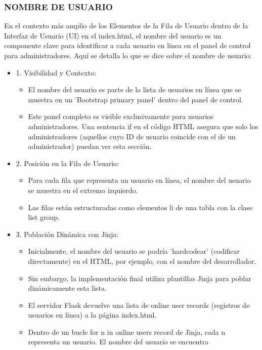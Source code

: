 \documentclass{report}
\begin{document}
\subsubsection{NOMBRE DE USUARIO}
En el contexto más amplio de los Elementos de la Fila de Usuario dentro de la Interfaz de Usuario (UI) en el index.html, el nombre del 
usuario es un componente clave para identificar a cada usuario en línea en el panel de control para administradores.
Aquí se detalla lo que se dice sobre el nombre de usuario:
\begin{itemize}
    \item 1. Visibilidad y Contexto:
        \begin{itemize}
            \item El nombre del usuario es parte de la lista de usuarios en línea que se muestra en un 'Bootstrap primary panel' dentro 
            del panel de control.
            \item Este panel completo es visible exclusivamente para usuarios administradores. Una sentencia if en el código HTML asegura 
            que solo los administradores (aquellos cuyo ID de usuario coincide con el de un administrador) puedan ver esta sección.
        \end{itemize}
    \item 2. Posición en la Fila de Usuario:
        \begin{itemize}
            \item Para cada fila que representa un usuario en línea, el nombre del usuario se muestra en el extremo izquierdo.
            \item Las filas están estructuradas como elementos li de una tabla con la clase list group.        
        \end{itemize}
    \item 3. Población Dinámica con Jinja:
        \begin{itemize}
            \item Inicialmente, el nombre del usuario se podría 'hardcodear' (codificar directamente) en el HTML, por ejemplo, con el nombre 
            del desarrollador.
            \item Sin embargo, la implementación final utiliza plantillas Jinja para poblar dinámicamente esta lista.
            \item El servidor Flask devuelve una lista de online user records (registros de usuarios en línea) a la página index.html.
            \item Dentro de un bucle for n in online users record de Jinja, cada n representa un usuario. El nombre del usuario se encuentra 

\end{itemize}
\end{itemize}
\end{document}

